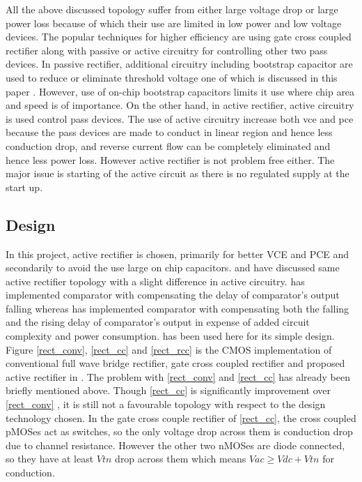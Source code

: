 \documentclass[12pt,a4paper,UKenglish]{article}
\begin{document}
All the above discussed topology suffer from either large voltage drop or large power loss because of which their use are limited in low power and low voltage devices. The popular techniques for higher efficiency are using gate cross coupled rectifier along with passive or active circuitry  for controlling other two pass devices. In passive rectifier, additional circuitry including bootstrap capacitor are used to reduce or eliminate threshold voltage one of which is discussed in this paper \cite{rectboot}. However, use of on-chip bootstrap capacitors limits it use where chip area and speed is of importance. On the other hand, in active rectifier, active circuitry is used control pass devices. The use of active circuitry increase both  \gls{vce} and  \gls{pce} because the pass devices are made to conduct in linear region and hence less conduction drop, and reverse current flow can be completely eliminated and hence less power loss. However active rectifier is not problem free either. The major issue is starting of the active circuit as there is no regulated supply at the start up. \\

\subsection{Design}

In this project, active rectifier is chosen, primarily for better VCE and PCE and secondarily to avoid the use large on chip capacitors. \cite{rectrcc}  and \cite{rectcomp} have discussed same active rectifier topology with a slight difference in active circuitry. \cite{rectrcc} has implemented comparator with compensating the delay of comparator's output falling whereas \cite{rectcomp} has implemented comparator with compensating both the falling and the rising delay of comparator's output in expense of added circuit complexity and power consumption. \cite{rectrcc} has been used here for its simple design. \\

Figure \ref{rect_conv}, \ref{rect_cc} and \ref{rect_rcc} is the CMOS implementation of conventional full wave bridge rectifier, gate cross coupled rectifier and proposed active rectifier in \cite{rectrcc}. The problem with \ref{rect_conv} and \ref{rect_cc} has already been briefly mentioned above. Though  \ref{rect_cc}  is significantly improvement over  \ref{rect_conv} , it is still not a favourable topology with respect to the design technology chosen. In the gate cross couple rectifier of  \ref{rect_cc}, the cross coupled pMOSes act as switches, so the only voltage drop across them is conduction drop due to channel resistance. However the other two nMOSes are diode connected, so they have at least $Vtn$ drop across them which means $Vac \geq Vdc + Vtn$ for conduction. \\
\end{document}
